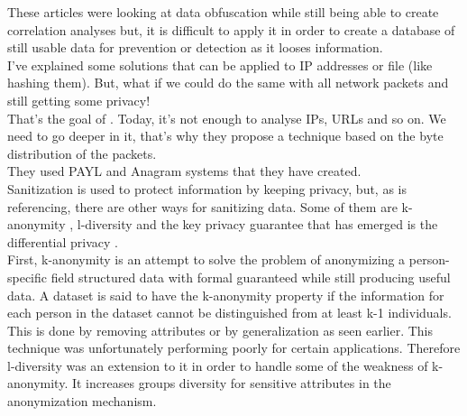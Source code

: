 \documentclass{eplmastersthesis}
\begin{document}
These articles were looking at data obfuscation while still being able to create correlation analyses but, it is difficult to apply it in order to create a database of still usable data for prevention or detection as it looses information.
\\

I've explained some solutions that can be applied to IP addresses or file (like hashing them). But, what if we could do the same with all network packets and still getting some privacy!\\
That's the goal of \cite{parekh2006privacy}. Today, it's not enough to analyse IPs, URLs and so on. We need to go deeper in it, that's why they propose a technique based on the byte distribution of the packets.\\
They used PAYL and Anagram \cite{wang2006network} systems that they have created.\\

Sanitization is used to protect information by keeping privacy, but, as \cite{mohaisen2017rethinking} is referencing, there are other ways for sanitizing data. Some of them are k-anonymity \cite{sweeney2002k}, l-diversity \cite{machanavajjhala2007diversity} and the key privacy guarantee that has emerged is the differential privacy \cite{dwork2008differential}.\\
First, k-anonymity is an attempt to solve the problem of anonymizing a person-specific field structured data with formal guaranteed while still producing useful data. A dataset is said to have the k-anonymity property if the information for each person in the dataset cannot be distinguished from at least k-1 individuals. This is done by removing attributes or by generalization as seen earlier. This technique was unfortunately performing poorly for certain applications. Therefore l-diversity was an extension to it in order to handle some of the weakness of k-anonymity. It increases groups diversity for sensitive attributes in the anonymization mechanism.\\
\end{document}
